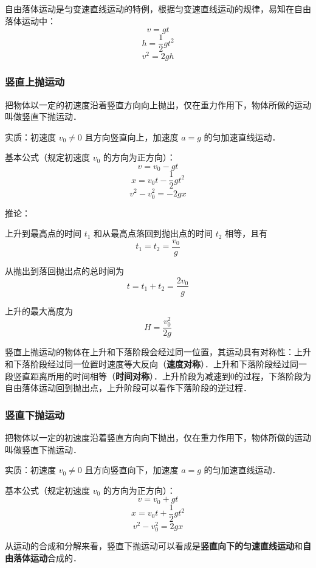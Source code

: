 自由落体运动是匀变速直线运动的特例，根据匀变速直线运动的规律，易知在自由落体运动中：
\begin{equation}
v=gt
\end{equation}
\begin{equation}
h=\frac12gt^2
\end{equation}
\begin{equation}
v^2=2gh
\end{equation}

\subsubsection{竖直上抛运动}
把物体以一定的初速度沿着竖直方向向上抛出，仅在重力作用下，物体所做的运动叫做竖直下抛运动．

实质：初速度 $v_0\neq0$ 且方向竖直向上，加速度 $a=g$ 的匀加速直线运动．

基本公式（规定初速度 $v_0$ 的方向为正方向）：
\begin{equation}
v=v_0-gt
\end{equation}
\begin{equation}
x=v_0t-\frac12gt^2
\end{equation}
\begin{equation}
v^2-v_0^2=-2gx
\end{equation}

推论：

上升到最高点的时间 $t_1$ 和从最高点落回到抛出点的时间 $t_2$ 相等，且有
\begin{equation}
t_1=t_2=\frac{v_0}{g}
\end{equation}

从抛出到落回抛出点的总时间为
\begin{equation}
t=t_1+t_2=\frac{2v_0}{g}
\end{equation}

上升的最大高度为
\begin{equation}
H=\frac{v_0^2}{2g}
\end{equation}

竖直上抛运动的物体在上升和下落阶段会经过同一位置，其运动具有对称性：上升和下落阶段经过同一位置时速度等大反向（\textbf{速度对称}）．上升和下落阶段经过同一段竖直距离所用的时间相等（\textbf{时间对称}）．上升阶段为减速到0的过程，下落阶段为自由落体运动回到抛出点，上升阶段可以看作下落阶段的逆过程．

\subsubsection{竖直下抛运动}
把物体以一定的初速度沿着竖直方向向下抛出，仅在重力作用下，物体所做的运动叫做竖直下抛运动．

实质：初速度 $v_0\neq0$ 且方向竖直向下，加速度 $a=g$ 的匀加速直线运动．

基本公式（规定初速度 $v_0$ 的方向为正方向）：
\begin{equation}
v=v_0+gt
\end{equation}
\begin{equation}
x=v_0t+\frac12gt^2
\end{equation}
\begin{equation}
v^2-v_0^2=2gx
\end{equation}

从运动的合成和分解来看，竖直下抛运动可以看成是\textbf{竖直向下的匀速直线运动}和\textbf{自由落体运动}合成的．